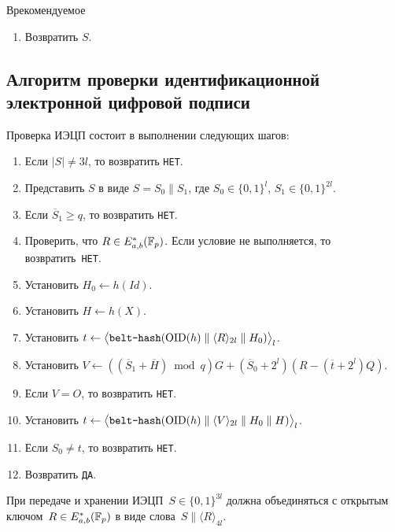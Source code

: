 \begin{appendix}{В}{рекомендуемое}
\begin{enumerate}
\item
Возвратить $S$.
\end{enumerate}

\subsection{Алгоритм проверки идентификационной 
электронной цифровой подписи}
\label{IBS.Verify}

Проверка ИЭЦП состоит 
в выполнении следующих шагов:
\begin{enumerate}
\item
Если $|S|\neq 3l$,
то возвратить \texttt{НЕТ}.

\item
Представить $S$ в виде $S=S_0\parallel S_1$,
где $S_0\in\{0,1\}^{l}$, $S_1\in\{0,1\}^{2l}$.

\item
Если $\overline{S}_1\geq q$,
то возвратить \texttt{НЕТ}.

\item
Проверить, что $R\in E_{a,b}^*(\mathbb{F}_p)$.
Если условие не выполняется, то возвратить~\texttt{НЕТ}.

\item
Установить $H_0\leftarrow h(Id)$.

\item
Установить $H\leftarrow h(X)$.

\item
Установить $t\leftarrow
\bigl\langle\texttt{belt-hash}
(\text{\normalfont OID}(h)\parallel\langle R\rangle_{2l}\parallel H_0)
\bigr\rangle_l$.

\item
Установить
$V\leftarrow \left((\overline{S}_1+\overline{H})\bmod q\right)G+
(\overline{S}_0+2^{l})(R-(\overline{t} + 2^l)Q)$.

\item
Если $V=O$, то возвратить \texttt{НЕТ}.
         
\item
Установить $t\leftarrow
\bigl\langle\texttt{belt-hash}
(\text{\normalfont OID}(h)\parallel\langle V\rangle_{2l}\parallel H_0\parallel H)
\bigr\rangle_l$.

\item
Если $S_0\neq t$,
то возвратить \texttt{НЕТ}.

\item
Возвратить \texttt{ДА}.
\end{enumerate}
               

\label{IBS.Format}

При передаче и хранении ИЭЦП~$S\in\{0,1\}^{3l}$
должна объединяться с открытым ключом~$R\in E_{a,b}^*(\mathbb{F}_p)$ 
в виде слова~$S\parallel\langle R\rangle_{4l}$.

\end{appendix}
